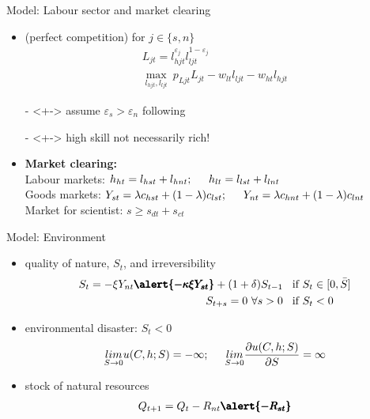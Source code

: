 \documentclass[11pt,aspectratio=169]{beamer}
\begin{document}
\begin{frame}{Model: Labour sector and market clearing}
	\begin{itemize}
\item<+-> \alert{} (perfect competition) for $j\in\{s,n\}$
\begin{align*}
L_{jt}=l_{hjt}^{\varepsilon_j}l_{ljt}^{1-\varepsilon_j}\\
\underset{l_{hjt}, l_{ljt}}{\max}\  p_{Ljt}L_{jt}-w_{lt}l_{ljt}-w_{ht}l_{hjt}%
\end{align*}
\vspace{-2mm}
\item[-]<+-> assume $\varepsilon_s>\varepsilon_n$ following \cite{Consoli2016DoCapital}
\vspace{-1mm}
\item[-]<+-> high skill not necessarily rich!
\vspace{3mm}
\item<+-> \textbf{Market clearing:}\\
{Labour markets}: \hspace{10mm}
$ h_{ht}= l_{hst}+l_{hnt}; \  \hspace{4mm}
  h_{lt}= l_{lst}+l_{lnt}$
\\ {Goods markets}: \hspace{11mm} 
$Y_{st}=\lambda c_{hst}+(1-\lambda)c_{lst}; \ \hspace{4mm} Y_{nt}=\lambda c_{hnt}+(1-\lambda)c_{lnt}$
\\
Market for scientist: \hspace{4mm} $s\geq s_{dt}+s_{ct}$
	\end{itemize}
\end{frame}

\begin{frame}{Model: Environment}
\begin{itemize}
\item<+-> quality of nature, $S_t$, and irreversibility
\begin{align*}
S_{t}= -\xi Y_{nt}\pmb{\alert{-\kappa \xi Y_{st}}}+(1+\delta)S_{t-1} & \hspace{3mm} \text{if}\  S_{t}\in[0,\bar{S}]\\
S_{t+s}=0 \ \forall s>0& \hspace{3mm}  \text{if} \ S_{t}<0
\end{align*}
\item<+-> environmental disaster: $S_t<0$
\begin{align*}
\underset{S\rightarrow0}{lim} u(C,h;S)=-\infty; 
\hspace{5mm} 
\underset{S\rightarrow0}{lim}\frac{\partial u(C,h;S)}{\partial S}=\infty
\end{align*}
\item<+-> stock of natural resources
\begin{align*}
Q_{t+1}=Q_t-R_{nt}\pmb{\alert{-R_{st}}}
\end{align*}
\end{itemize}
\end{frame}
\end{document}
